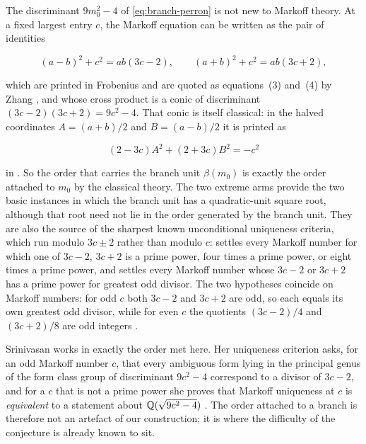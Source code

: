 \begin{remark}
\label{rem:frobenius-conic}
The discriminant $9m_0^2-4$ of \cref{eq:branch-perron} is not new to Markoff
theory. At a fixed largest entry $c$, the Markoff equation can be written as
the pair of identities

\begin{equation}
 (a-b)^2+c^2=ab(3c-2),
 \qquad
 (a+b)^2+c^2=ab(3c+2),
 \label{eq:frobenius-identities}
\end{equation}

which are printed in Frobenius \cite[p.~601 of the reprint]{Frobenius1913}
and are quoted as equations~(3) and~(4) by Zhang \cite{Zhang2007}, and whose
cross product is a conic of discriminant $(3c-2)(3c+2)=9c^2-4$. That conic is
itself classical: in the halved coordinates $A=(a+b)/2$ and $B=(a-b)/2$ it is
printed as

\begin{equation}
 (2-3c)A^2+(2+3c)B^2=-c^2
 \label{eq:srinivasan-conic}
\end{equation}

in \cite[eq.~(2.3)]{Srinivasan2009}. So the
order that carries the branch unit $\beta(m_0)$ is exactly the order attached
to $m_0$ by the classical theory. The two extreme arms provide the two basic
instances in which the branch unit has a quadratic-unit square root, although
that root need not lie in the order generated by the branch unit. They are
also the source of the sharpest known unconditional
uniqueness criteria, which run modulo $3c\pm2$ rather than modulo $c$:
\cite[Theorem~2]{Zhang2007} settles every Markoff number for which one of
$3c-2$, $3c+2$ is a prime power, four times a prime power, or eight times a
prime power, and \cite[Theorem~2.3]{Srinivasan2009} settles every Markoff
number whose $3c-2$ or $3c+2$ has a prime power for greatest odd divisor. The
two hypotheses coincide on Markoff numbers: for odd $c$ both $3c-2$ and
$3c+2$ are odd, so each equals its own greatest odd divisor, while for even
$c$ the quotients $(3c-2)/4$ and $(3c+2)/8$ are odd integers
\cite[Lemma~4.2(3)]{Srinivasan2009}.

Srinivasan works in exactly the order met here. Her uniqueness criterion
\cite[Theorem~5.4]{Srinivasan2009} asks, for an odd Markoff number $c$, that
every ambiguous form lying in the principal genus of the form class group of
discriminant $9c^2-4$ correspond to a divisor of $3c-2$, and for a $c$ that is not a prime power she proves that
Markoff uniqueness at $c$ is \emph{equivalent} to a statement about
$\mathbb{Q}(\sqrt{9c^2-4})$ \cite[Theorem~5.3]{Srinivasan2009}. The order attached to
a branch is therefore not an artefact of our construction; it is where the
difficulty of the conjecture is already known to sit.


\end{remark}
